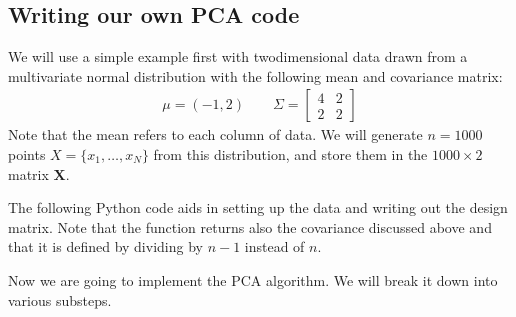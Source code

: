 \documentclass[letterpaper,10pt,english]{sphinxmanual}
\begin{document}
\subsection{Writing our own PCA code}
\label{\detokenize{chapter8:writing-our-own-pca-code}}
We will use a simple example first with two\sphinxhyphen{}dimensional data
drawn from a multivariate normal distribution with the following mean and covariance matrix:
\begin{equation*}
\begin{split}
\mu = (-1,2) \qquad \Sigma = \begin{bmatrix} 4 & 2 \\
2 & 2
\end{bmatrix}
\end{split}
\end{equation*}
Note that the mean refers to each column of data.
We will generate \(n = 1000\) points \(X = \{ x_1, \ldots, x_N \}\) from
this distribution, and store them in the \(1000 \times 2\) matrix \(\boldsymbol{X}\).

The following Python code aids in setting up the data and writing out the design matrix.
Note that the function  returns also the covariance discussed above and that it is defined by dividing by \(n-1\) instead of \(n\).

\begin{sphinxVerbatim}[commandchars=\\\{\}]
   
   
   
   
  
   
  \PYG{p}{[}\PYG{p}{[} \PYG{p}{]} \PYG{p}{[} \PYG{p}{]}\PYG{p}{]}
    
\end{sphinxVerbatim}

Now we are going to implement the PCA algorithm. We will break it down into various substeps.
\end{document}
